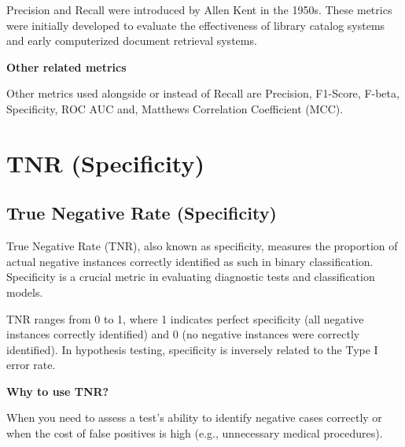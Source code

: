 {
    Precision and Recall were introduced by Allen Kent in the 1950s. These metrics were initially developed to evaluate the effectiveness of library catalog
    systems and early computerized document retrieval systems.
}

\textbf{Other related metrics}

Other metrics used alongside or instead of Recall are Precision, F1-Score, F-beta, Specificity, ROC AUC and, Matthews Correlation Coefficient (MCC).

\clearpage
\thispagestyle{classificationstyle}
\section{TNR (Specificity)}
\subsection{True Negative Rate (Specificity)}

True Negative Rate (TNR), also known as specificity, measures the proportion of actual negative instances correctly identified as such in binary classification.
Specificity is a crucial metric in evaluating diagnostic tests and classification models.

\begin{center}
\end{center}

TNR ranges from 0 to 1, where 1 indicates perfect specificity (all negative instances correctly identified) and 0 (no negative instances were correctly identified).
In hypothesis testing, specificity is inversely related to the Type I error rate.

\textbf{Why to use TNR?}

When you need to assess a test's ability to identify negative cases correctly or when the cost of false positives is high (e.g., unnecessary medical procedures).

